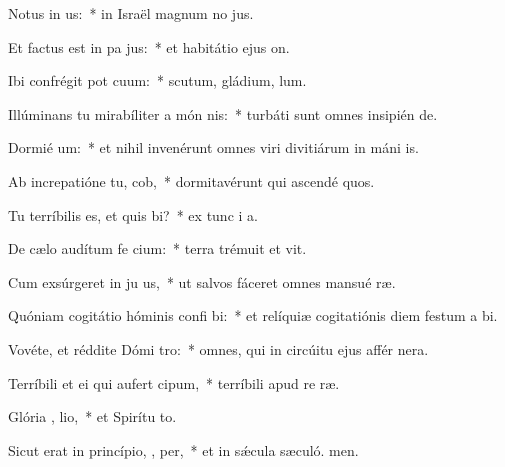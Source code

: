 \item Notus in  us:~* in Israël magnum no jus.
\item Et factus est in pa  jus:~* et habitátio ejus  on.
\item Ibi confrégit pot cuum:~* scutum, gládium,  lum.
\item Illúminans tu mirabíliter a món nis:~* turbáti sunt omnes insipién de.
\item Dormié  um:~* et nihil invenérunt omnes viri divitiárum in máni is.
\item Ab increpatióne tu,  cob,~* dormitavérunt qui ascendé quos.
\item Tu terríbilis es, et quis  bi?~* ex tunc i a.
\item De cælo audítum fe cium:~* terra trémuit et vit.
\item Cum exsúrgeret in ju us,~* ut salvos fáceret omnes mansué ræ.
\item Quóniam cogitátio hóminis confi bi:~* et relíquiæ cogitatiónis diem festum a bi.
\item Vovéte, et réddite Dómi  tro:~* omnes, qui in circúitu ejus affér nera.
\item Terríbili et ei qui aufert  cipum,~* terríbili apud re ræ.
\item Glória ,  lio,~* et Spirítu to.
\item Sicut erat in princípio,  ,  per,~* et in sǽcula sæculó. men.
